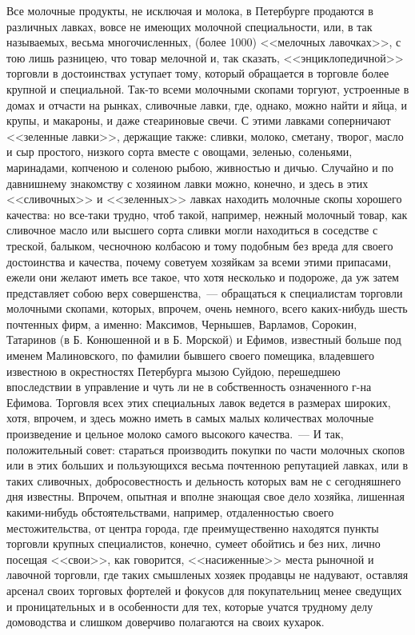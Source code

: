 Все молочные продукты, не исключая и молока, в Петербурге продаются в различных лавках, вовсе не имеющих молочной специальности, или, в так называемых, весьма многочисленных, (более 1000) <<мелочных лавочках>>, с тою лишь разницею, что товар мелочной и, так сказать, <<энциклопедичной>> торговли в достоинствах уступает тому, который обращается в торговле более крупной и специальной. Так-то всеми молочными скопами торгуют, устроенные в домах и отчасти на рынках, сливочные лавки, где, однако, можно найти и яйца, и крупы, и макароны, и даже стеариновые свечи. С этими лавками соперничают <<зеленные лавки>>, держащие также: сливки, молоко, сметану, творог, масло и сыр простого, низкого сорта вместе с овощами, зеленью, соленьями, маринадами, копченою и соленою рыбою, живностью и дичью. Случайно и по давнишнему знакомству с хозяином лавки можно, конечно, и здесь в этих <<сливочных>> и <<зеленных>> лавках находить молочные скопы хорошего качества: но все-таки трудно, чтоб такой, например, нежный молочный товар, как сливочное масло или высшего сорта сливки могли находиться в соседстве с треской, балыком, чесночною колбасою и тому подобным без вреда для своего достоинства и качества, почему советуем хозяйкам за всеми этими припасами, ежели они желают иметь все такое, что хотя несколько и подороже, да уж затем представляет собою верх совершенства,~--- обращаться к специалистам торговли молочными скопами, которых, впрочем, очень немного, всего каких-нибудь шесть почтенных фирм, а именно: Максимов, Чернышев, Варламов, Сорокин, Татаринов (в Б. Конюшенной и в Б. Морской) и Ефимов, известный больше под именем Малиновского, по фамилии бывшего своего помещика, владевшего известною в окрестностях Петербурга мызою Суйдою, перешедшею впоследствии в управление и чуть ли не в собственность означенного г-на Ефимова. Торговля всех этих специальных лавок ведется в размерах широких, хотя, впрочем, и здесь можно иметь в самых малых количествах молочные произведение и цельное молоко самого высокого качества.~--- И так, положительный совет: стараться производить покупки по части молочных скопов или в этих больших и пользующихся весьма почтенною репутацией лавках, или в таких сливочных, добросовестность и дельность которых вам не с сегодняшнего дня известны. Впрочем, опытная и вполне знающая свое дело хозяйка, лишенная какими-нибудь обстоятельствами, например, отдаленностью своего местожительства, от центра города, где преимущественно находятся пункты торговли крупных специалистов, конечно, сумеет обойтись и без них, лично посещая <<свои>>, как говорится, <<насиженные>> места рыночной и лавочной торговли, где таких смышленых хозяек продавцы не надувают, оставляя арсенал своих торговых фортелей и фокусов для покупательниц менее сведущих и проницательных и в особенности для тех, которые учатся трудному делу домоводства и слишком доверчиво полагаются на своих кухарок.

